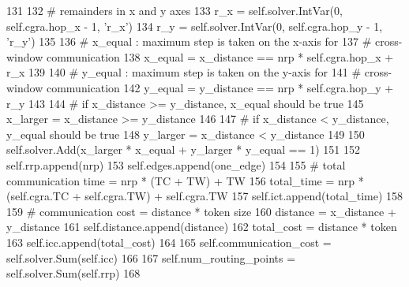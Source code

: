 \begin{DoxyCode}
131 
132                 \textcolor{comment}{# remainders in x and y axes}
133                 r\_x = self.solver.IntVar(0, self.cgra.hop\_x - 1, \textcolor{stringliteral}{'r\_x'})
134                 r\_y = self.solver.IntVar(0, self.cgra.hop\_y - 1, \textcolor{stringliteral}{'r\_y'})
135 
136                 \textcolor{comment}{# x\_equal : maximum step is taken on the x-axis for}
137                 \textcolor{comment}{# cross-window communication}
138                 x\_equal = x\_distance == nrp * self.cgra.hop\_x + r\_x
139 
140                 \textcolor{comment}{# y\_equal : maximum step is taken on the y-axis for}
141                 \textcolor{comment}{# cross-window communication}
142                 y\_equal = y\_distance == nrp * self.cgra.hop\_y + r\_y
143 
144                 \textcolor{comment}{# if x\_distance >= y\_distance, x\_equal should be true}
145                 x\_larger = x\_distance >= y\_distance
146 
147                 \textcolor{comment}{# if x\_distance < y\_distance, y\_equal should be true}
148                 y\_larger = x\_distance < y\_distance
149 
150                 self.solver.Add(x\_larger * x\_equal + y\_larger * y\_equal == 1)
151 
152                 self.rrp.append(nrp)
153                 self.edges.append(one\_edge)
154 
155                 \textcolor{comment}{# total communication time = nrp * (TC + TW) + TW}
156                 total\_time = nrp * (self.cgra.TC + self.cgra.TW) + self.cgra.TW
157                 self.ict.append(total\_time)
158 
159                 \textcolor{comment}{# communication cost = distance * token size}
160                 distance = x\_distance + y\_distance
161                 self.distance.append(distance)
162                 total\_cost = distance * token
163                 self.icc.append(total\_cost)
164 
165         self.communication\_cost = self.solver.Sum(self.icc)
166 
167         self.num\_routing\_points = self.solver.Sum(self.rrp)
168 
\end{DoxyCode}
\mbox{\label{classsylva_1_1code__generation_1_1floorplanner_1_1floorplanner_a4ef5c93298c0f40db47c15ed7c9c6f02}} 
